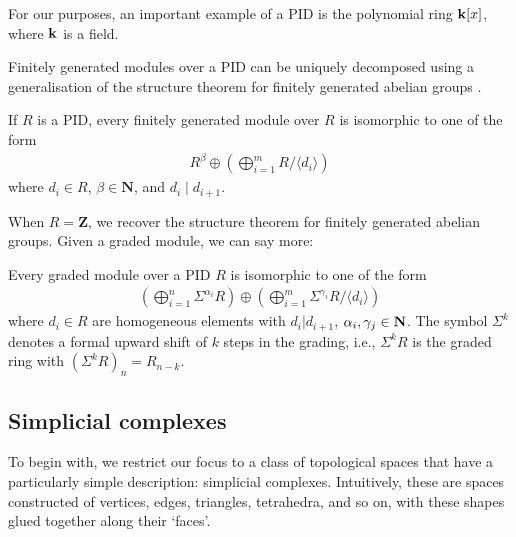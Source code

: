 \begin{example}
For our purposes, an important example of a PID is the polynomial ring $\mathbf{k}[x]$, where $\mathbf{k}$ is a field.
\end{example}

Finitely generated modules over a PID can be uniquely decomposed using a generalisation of the structure theorem for finitely generated abelian groups \cite{dummit-foote}.

\begin{theorem}
If $R$ is a PID, every finitely generated module over $R$ is isomorphic to one of the form
\begin{align*}
R^\beta \oplus \left( \bigoplus_{i=1}^m R / \langle d_i \rangle \right)
\end{align*}
where $d_i \in R$, $\beta \in \mathbf{N}$, and $d_i \mid d_{i+1}$.
\end{theorem}

When $R = \mathbf{Z}$, we recover the structure theorem for finitely generated abelian groups. Given a graded module, we can say more:

\begin{theorem}
\label{thm:graded-pid-structure}
Every graded module over a PID $R$ is isomorphic to one of the form
\begin{align*}
\left( \bigoplus_{i=1}^n \Sigma^{\alpha_i} R \right) \oplus \left( \bigoplus_{i=1}^m \Sigma^{\gamma_i} R / \langle d_i \rangle \right)
\end{align*}
where $d_i \in R$ are homogeneous elements with $d_i | d_{i+1}$, $\alpha_i, \gamma_j \in \mathbf{N}$. The symbol $\Sigma^k$ denotes a formal upward shift of $k$ steps in the grading, i.e., $\Sigma^k R$ is the graded ring with $(\Sigma^k R)_n = R_{n - k}$.
\end{theorem}

\subsection{Simplicial complexes}
To begin with, we restrict our focus to a class of topological spaces that have a particularly simple description: simplicial complexes. Intuitively, these are spaces constructed of vertices, edges, triangles, tetrahedra, and so on, with these shapes glued together along their `faces'.

